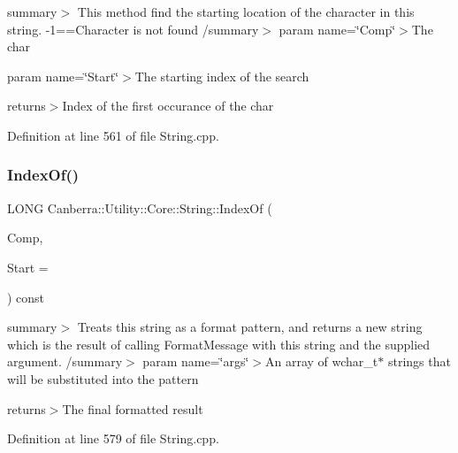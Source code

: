 summary$>$ This method find the starting location of the character in this string. -\/1==Character is not found /summary$>$ param name=\char`\"{}\+Comp\char`\"{}$>$The char 

param name=\char`\"{}\+Start\char`\"{}$>$The starting index of the search

returns$>$Index of the first occurance of the char

Definition at line 561 of file String.\+cpp.

\mbox{\label{class_canberra_1_1_utility_1_1_core_1_1_string_acc06ef1245c083575c0a96144efda0d1_acc06ef1245c083575c0a96144efda0d1}} 
\subsubsection{\texorpdfstring{Index\+Of()}{IndexOf()}\hspace{0.1cm}{\footnotesize\ttfamily [2/2]}}
{\footnotesize\ttfamily L\+O\+NG Canberra\+::\+Utility\+::\+Core\+::\+String\+::\+Index\+Of (\begin{DoxyParamCaption}\item[{wchar\+\_\+t}]{Comp,  }\item[{long}]{Start = {} }\end{DoxyParamCaption}) const}

summary$>$ Treats this string as a format pattern, and returns a new string which is the result of calling Format\+Message with this string and the supplied argument. /summary$>$ param name=\char`\"{}args\char`\"{}$>$An array of wchar\+\_\+t$\ast$ strings that will be substituted into the pattern

returns$>$The final formatted result

Definition at line 579 of file String.\+cpp.

\mbox{\label{class_canberra_1_1_utility_1_1_core_1_1_string_a1a01a4decb814a51f7d4d13dbb95fb49_a1a01a4decb814a51f7d4d13dbb95fb49}} 
